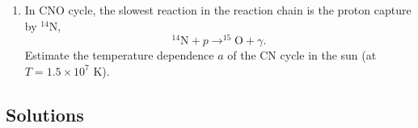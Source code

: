 \begin{enumerate}[label=5.\arabic*]
          process, along with whether energy is absorbed or released during each step$?$
        \begin{enumerate}[label=(\alph*)]
            \item $^{4}\text{He} + ^{4}\text{He} \to ^{8}\text{Be}$
            \item $^{8}\text{Be} + ^{4}\text{He} \to ^{12}\text{C}^*$
            \item $^{12}\text{C}^* \to ^{12}\text{C} + \gamma$
        \end{enumerate}
        \item In CNO cycle, the slowest reaction in the reaction chain is the proton capture by $^{14}\text{N}$, 
            \[ ^{14}\text{N} + p \to ^{15}\text{O} + \gamma. \]
        Estimate the temperature dependence $a$ of the CN cycle in the sun (at $T=1.5 \times 10^7$ K).
\end{enumerate}

\subsection{Solutions}
